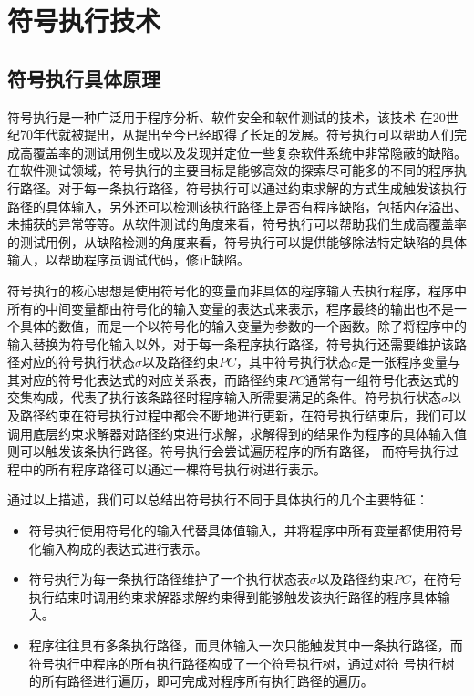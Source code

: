 \section{符号执行技术}

\subsection{符号执行具体原理}

符号执行是一种广泛用于程序分析、软件安全和软件测试的技术，该技术 在20世纪70年代就被提出，从提出至今已经取得了长足的发展。符号执行可以帮助人们完成高覆盖率的测试用例生成以及发现并定位一些复杂软件系统中非常隐蔽的缺陷。在软件测试领域，符号执行的主要目标是能够高效的探索尽可能多的不同的程序执行路径。对于每一条执行路径，符号执行可以通过约束求解的方式生成触发该执行路径的具体输入，另外还可以检测该执行路径上是否有程序缺陷，包括内存溢出、未捕获的异常等等。从软件测试的角度来看，符号执行可以帮助我们生成高覆盖率的测试用例，从缺陷检测的角度来看，符号执行可以提供能够除法特定缺陷的具体输入，以帮助程序员调试代码，修正缺陷。

符号执行的核心思想是使用符号化的变量而非具体的程序输入去执行程序，程序中所有的中间变量都由符号化的输入变量的表达式来表示，程序最终的输出也不是一个具体的数值，而是一个以符号化的输入变量为参数的一个函数。除了将程序中的输入替换为符号化输入以外，对于每一条程序执行路径，符号执行还需要维护该路径对应的符号执行状态$\sigma$以及路径约束$PC$，其中符号执行状态$\sigma$是一张程序变量与其对应的符号化表达式的对应关系表，而路径约束$PC$通常有一组符号化表达式的交集构成，代表了执行该条路径时程序输入所需要满足的条件。符号执行状态$\sigma$以及路径约束在符号执行过程中都会不断地进行更新，在符号执行结束后，我们可以调用底层约束求解器对路径约束进行求解，求解得到的结果作为程序的具体输入值则可以触发该条执行路径。符号执行会尝试遍历程序的所有路径， 而符号执行过程中的所有程序路径可以通过一棵符号执行树进行表示。

通过以上描述，我们可以总结出符号执行不同于具体执行的几个主要特征：
\begin{itemize}
    \item 符号执行使用符号化的输入代替具体值输入，并将程序中所有变量都使用符号化输入构成的表达式进行表示。
    \item 符号执行为每一条执行路径维护了一个执行状态表$\sigma$以及路径约束$PC$，在符号执行结束时调用约束求解器求解约束得到能够触发该执行路径的程序具体输入。
    \item 程序往往具有多条执行路径，而具体输入一次只能触发其中一条执行路径，而符号执行中程序的所有执行路径构成了一个符号执行树，通过对符 号执行树的所有路径进行遍历，即可完成对程序所有执行路径的遍历。
\end{itemize}

